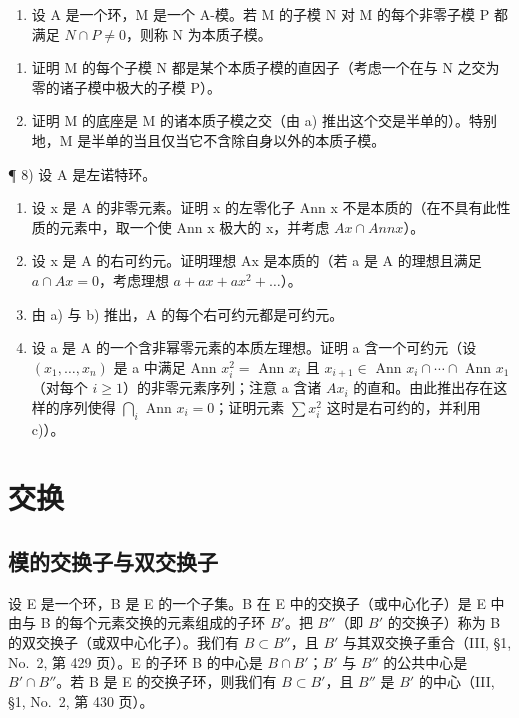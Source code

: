 \begin{enumerate}
\def\labelenumi{\arabic{enumi})}
\setcounter{enumi}{6}
\tightlist
\item
  设 A 是一个环，M 是一个 A-模。若 M 的子模 N 对 M 的每个非零子模 P 都满足 \(N \cap P \neq 0\)，则称 N 为本质子模。
\end{enumerate}

\begin{enumerate}
\def\labelenumi{\alph{enumi})}
\item
  证明 M 的每个子模 N 都是某个本质子模的直因子（考虑一个在与 N 之交为零的诸子模中极大的子模 P）。
\item
  证明 M 的底座是 M 的诸本质子模之交（由 a) 推出这个交是半单的）。特别地，M 是半单的当且仅当它不含除自身以外的本质子模。
\end{enumerate}

¶ 8) 设 A 是左诺特环。

\begin{enumerate}
\def\labelenumi{\alph{enumi})}
\item
  设 x 是 A 的非零元素。证明 x 的左零化子 Ann x 不是本质的（在不具有此性质的元素中，取一个使 Ann x 极大的 x，并考虑 \(Ax \cap Ann x\)）。
\item
  设 x 是 A 的右可约元。证明理想 Ax 是本质的（若 a 是 A 的理想且满足 \(a \cap Ax = 0\)，考虑理想 \(a + ax + ax^{2} + \ldots\)）。
\item
  由 a) 与 b) 推出，A 的每个右可约元都是可约元。
\item
  设 a 是 A 的一个含非幂零元素的本质左理想。证明 a 含一个可约元（设 \((x_{1},\ldots,x_{n})\) 是 a 中满足 Ann \(x_{i}^{2}=\) Ann \(x_{i}\) 且 \(x_{i+1}\in\) Ann \(x_{i}\cap\cdots\cap\) Ann \(x_{1}\)（对每个 \(i\geqslant1\)）的非零元素序列；注意 a 含诸 \(Ax_{i}\) 的直和。由此推出存在这样的序列使得 \(\bigcap_{i}\) Ann \(x_{i}=0\)；证明元素 \(\sum x_{i}^{2}\) 这时是右可约的，并利用 c)）。
\end{enumerate}

\section{交换}

\subsection{模的交换子与双交换子}

设 E 是一个环，B 是 E 的一个子集。B 在 E 中的交换子（或中心化子）是 E 中由与 B 的每个元素交换的元素组成的子环 \(B'\)。把 \(B''\)（即 \(B'\) 的交换子）称为 B 的双交换子（或双中心化子）。我们有 \(B \subset B''\)，且 \(B'\) 与其双交换子重合（III, §1, No.~2, 第 429 页）。E 的子环 B 的中心是 \(B \cap B'\)；\(B'\) 与 \(B''\) 的公共中心是 \(B' \cap B''\)。若 B 是 E 的交换子环，则我们有 \(B \subset B'\)，且 \(B''\) 是 \(B'\) 的中心（III, §1, No.~2, 第 430 页）。

